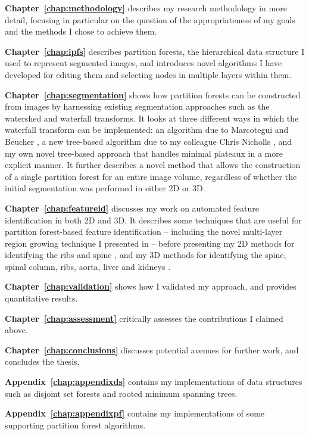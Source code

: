 \textbf{Chapter~\ref{chap:methodology}} describes my research methodology in more detail, focusing in particular on the question of the appropriateness of my goals and the methods I chose to achieve them.

\textbf{Chapter~\ref{chap:ipfs}} describes partition forests, the hierarchical data structure I used to represent segmented images, and introduces novel algorithms I have developed for editing them and selecting nodes in multiple layers within them.

\textbf{Chapter~\ref{chap:segmentation}} shows how partition forests can be constructed from images by harnessing existing segmentation approaches such as the watershed and waterfall transforms. It looks at three different ways in which the waterfall transform can be implemented: an algorithm due to Marcotegui and Beucher \cite{marcotegui05}, a new tree-based algorithm due to my colleague Chris Nicholls \cite{nicholls09}, and my own novel tree-based approach that handles minimal plateaux in a more explicit manner. It further describes a novel method that allows the construction of a single partition forest for an entire image volume, regardless of whether the initial segmentation was performed in either 2D or 3D.

\textbf{Chapter~\ref{chap:featureid}} discusses my work on automated feature identification in both 2D and 3D. It describes some techniques that are useful for partition forest-based feature identification -- including the novel multi-layer region growing technique I presented in \cite{gvcispa09} -- before presenting my 2D methods for identifying the ribs \cite{gvccimi08} and spine \cite{gvcispa09}, and my 3D methods for identifying the spine, spinal column, ribs, aorta, liver and kidneys \cite{gvcoucl10}.

\textbf{Chapter~\ref{chap:validation}} shows how I validated my approach, and provides quantitative results.

\textbf{Chapter~\ref{chap:assessment}} critically assesses the contributions I claimed above.

\textbf{Chapter~\ref{chap:conclusions}} discusses potential avenues for further work, and concludes the thesis.

\textbf{Appendix~\ref{chap:appendixds}} contains my implementations of data structures such as disjoint set forests and rooted minimum spanning trees.

\textbf{Appendix~\ref{chap:appendixpf}} contains my implementations of some supporting partition forest algorithms.

